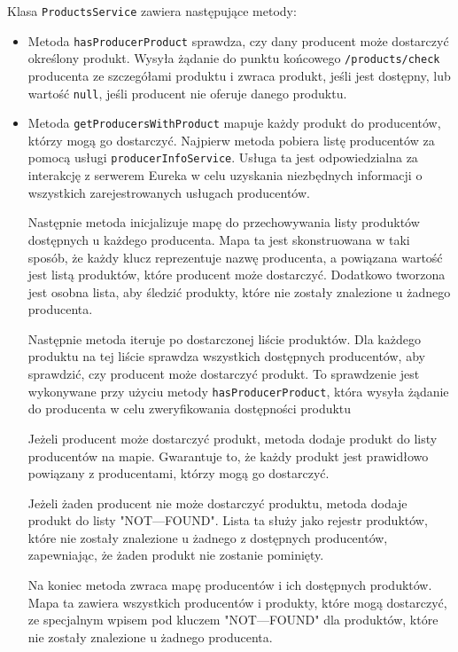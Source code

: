 Klasa \verb|ProductsService| zawiera następujące metody:
\begin{itemize}
    \item Metoda \verb|hasProducerProduct| sprawdza, czy dany producent może dostarczyć określony produkt. Wysyła żądanie  do punktu końcowego \verb|/products/check| producenta ze szczegółami produktu i zwraca produkt, jeśli jest dostępny, lub wartość \verb|null|, jeśli producent nie oferuje danego produktu.
    \item Metoda \verb|getProducersWithProduct| mapuje każdy produkt do producentów, którzy mogą go dostarczyć.
    Najpierw metoda pobiera listę producentów za pomocą usługi \verb|producerInfoService|. Usługa ta jest odpowiedzialna za interakcję z serwerem Eureka w celu uzyskania niezbędnych informacji o wszystkich zarejestrowanych usługach producentów.

    Następnie metoda inicjalizuje mapę do przechowywania listy produktów dostępnych u każdego producenta. Mapa ta jest skonstruowana w taki sposób, że każdy klucz reprezentuje nazwę producenta, a powiązana wartość jest listą produktów, które producent może dostarczyć. Dodatkowo tworzona jest osobna lista, aby śledzić produkty, które nie zostały znalezione u żadnego producenta.

    Następnie metoda iteruje po dostarczonej liście produktów. Dla każdego produktu na tej liście sprawdza wszystkich dostępnych producentów, aby sprawdzić, czy producent może dostarczyć produkt. To sprawdzenie jest wykonywane przy użyciu metody \verb|hasProducerProduct|, która wysyła żądanie do producenta w celu zweryfikowania dostępności produktu

    Jeżeli producent może dostarczyć produkt, metoda dodaje produkt do listy producentów na mapie. Gwarantuje to, że każdy produkt jest prawidłowo powiązany z producentami, którzy mogą go dostarczyć.

    Jeżeli żaden producent nie może dostarczyć produktu, metoda dodaje produkt do listy "NOT---FOUND". Lista ta służy jako rejestr produktów, które nie zostały znalezione u żadnego z dostępnych producentów, zapewniając, że żaden produkt nie zostanie pominięty.

    Na koniec metoda zwraca mapę producentów i ich dostępnych produktów. Mapa ta zawiera wszystkich producentów i produkty, które mogą dostarczyć, ze specjalnym wpisem pod kluczem "NOT---FOUND" dla produktów, które nie zostały znalezione u żadnego producenta.
\end{itemize}


